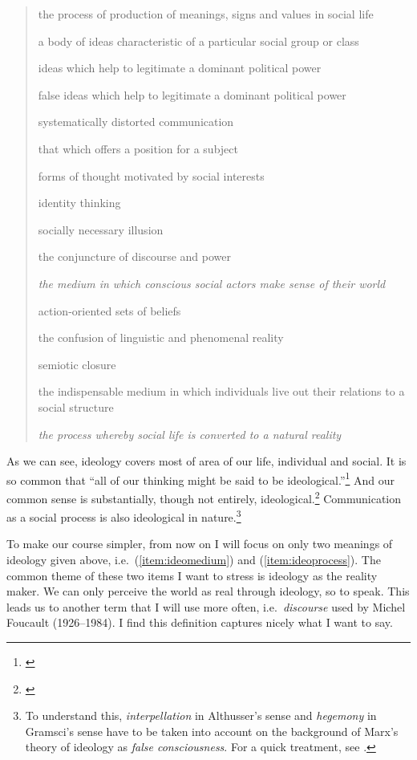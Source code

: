 \begin{quote}
\begin{compactenum}[(a)]
\item the process of production of meanings, signs and values in social life
\item a body of ideas characteristic of a particular social group or class
\item ideas which help to legitimate a dominant political power
\item false ideas which help to legitimate a dominant political power
\item systematically distorted communication
\item that which offers a position for a subject
\item forms of thought motivated by social interests
\item identity thinking
\item socially necessary illusion
\item the conjuncture of discourse and power
\item \textit{the medium in which conscious social actors make sense of their world} \label{item:ideomedium}
\item action-oriented sets of beliefs
\item the confusion of linguistic and phenomenal reality
\item semiotic closure
\item the indispensable medium in which individuals live out their relations to a social structure
\item \textit{the process whereby social life is converted to a natural reality} \label{item:ideoprocess}
\end{compactenum}
\end{quote}

As we can see, ideology covers most of area of our life, individual and social. It is so common that ``all of our thinking might be said to be ideological.''\footnote{\citealp[p.~4]{eagleton:ideology}} And our common sense is substantially, though not entirely, ideological.\footnote{\citealp[p.~84]{fairclough:power}} Communication as a social process is also ideological in nature.\footnote{To understand this, \emph{interpellation} in Althusser's sense and \emph{hegemony} in Gramsci's sense have to be taken into account on the background of Marx's theory of ideology as \emph{false consciousness}. For a quick treatment, see \citealp[pp.~172--8]{fiske:communication}.}

To make our course simpler, from now on I will focus on only two meanings of ideology given above, i.e.\ (\ref{item:ideomedium}) and (\ref{item:ideoprocess}). The common theme of these two items I want to stress is ideology as the reality maker. We can only perceive the world as real through ideology, so to speak. This leads us to another term that I will use more often, i.e.\ \emph{discourse} used by Michel Foucault (1926--1984). I find this definition captures nicely what I want to say.

